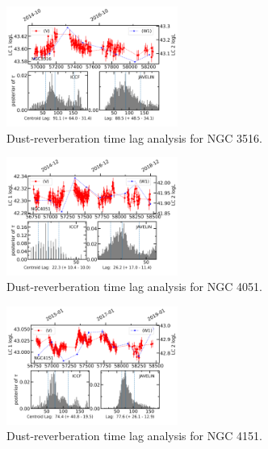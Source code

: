 \begin{figure}
\centering
	\includegraphics[width=0.5\textwidth]{pic/NGC3516lag.png}
    \caption{Dust-reverberation time lag analysis for NGC 3516. }
    \label{fig:lag_NGC3516}
\end{figure}

\begin{figure}
\centering
	\includegraphics[width=0.5\textwidth]{pic/NGC4051lag.png}
    \caption{Dust-reverberation time lag analysis for NGC 4051. }
    \label{fig:lag_NGC4051}
\end{figure}

\begin{figure}
\centering
	\includegraphics[width=0.5\textwidth]{pic/NGC4151lag.png}
    \caption{Dust-reverberation time lag analysis for NGC 4151. }
    \label{fig:lag_NGC4151}
\end{figure}

